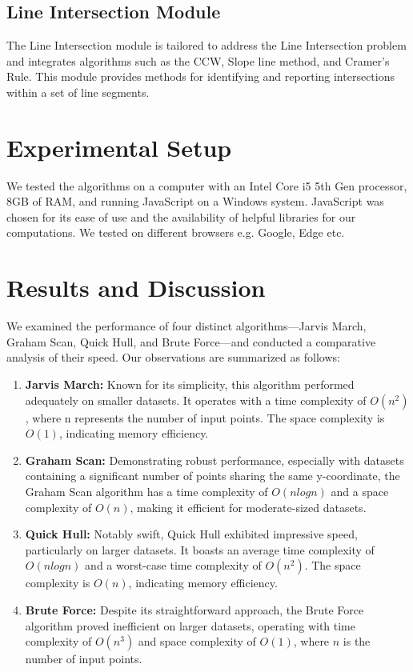 \documentclass[10pt,twocolumn]{article}
\begin{document}
    \subsection{Line Intersection Module}
        The Line Intersection module is tailored to address the Line Intersection problem and integrates algorithms such as the CCW, Slope line method, and Cramer's Rule. This module provides methods for identifying and reporting intersections within a set of line segments.

\section{Experimental Setup}
    We tested the algorithms on a computer with an Intel Core i5 5th Gen processor, 8GB of RAM, and running JavaScript on a Windows system. JavaScript was chosen for its ease of use and the availability of helpful libraries for our computations. We tested on different browsers e.g. Google, Edge etc.

\section{Results and Discussion}
    We examined the performance of four distinct algorithms—Jarvis March, Graham Scan, Quick Hull, and Brute Force—and conducted a comparative analysis of their speed. Our observations are summarized as follows:

    \begin{enumerate}
     \item \textbf{Jarvis March:} Known for its simplicity, this algorithm performed adequately on smaller datasets. It operates with a time complexity of $O(n^2)$, where n represents the number of input points. The space complexity is $O(1)$, indicating memory efficiency.
    
     \item \textbf{Graham Scan:} Demonstrating robust performance, especially with datasets containing a significant number of points sharing the same y-coordinate, the Graham Scan algorithm has a time complexity of $O(nlogn)$ and a space complexity of $O(n)$, making it efficient for moderate-sized datasets.
    
     \item \textbf{Quick Hull:} Notably swift, Quick Hull exhibited impressive speed, particularly on larger datasets. It boasts an average time complexity of $O(nlogn)$ and a worst-case time complexity of $O(n^2)$. The space complexity is $O(n)$, indicating memory efficiency.
    
     \item \textbf{Brute Force:} Despite its straightforward approach, the Brute Force algorithm proved inefficient on larger datasets, operating with time complexity of $O(n^3)$ and space complexity of $O(1)$, where $n$ is the number of input points.
    \end{enumerate}
    
\end{document}
